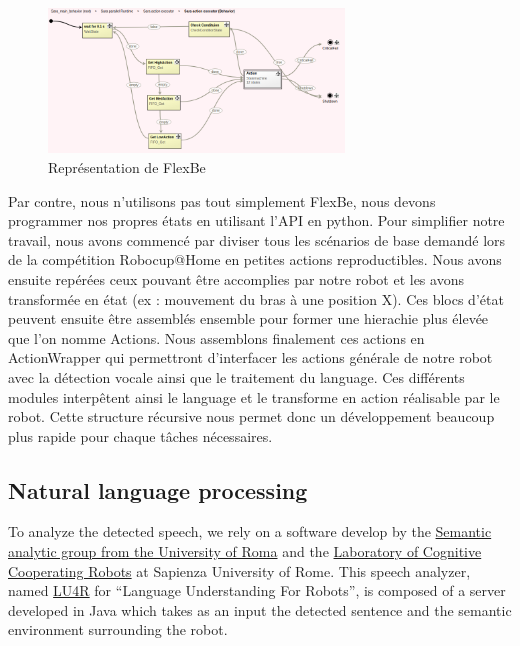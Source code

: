 \documentclass[runningheads,a4paper]{llncs}
\begin{document}
\begin{figure}[h!]
	\centering
	\includegraphics[width=0.70\textwidth]{images/flexbe.png}
	\caption{Représentation de FlexBe}
\end{figure}

Par contre, nous n'utilisons pas tout simplement FlexBe, nous devons programmer nos propres états en utilisant l'API en python. Pour simplifier notre travail, nous avons commencé par diviser tous les scénarios de base demandé lors de la compétition Robocup@Home en petites actions reproductibles. Nous avons ensuite repérées ceux pouvant être accomplies par notre robot et les avons transformée en état (ex : mouvement du bras à une position X). Ces blocs d'état peuvent ensuite être assemblés ensemble pour former une hierachie plus élevée que l'on nomme Actions. Nous assemblons finalement ces actions en ActionWrapper qui permettront d'interfacer les actions générale de notre robot avec la détection vocale ainsi que le traitement du language. Ces différents modules interpêtent ainsi le language et le transforme en action réalisable par le robot. Cette structure récursive nous permet donc un développement beaucoup plus rapide pour chaque tâches nécessaires. \\

\subsection{Natural language processing}
\tab To analyze the detected speech, we rely on a software develop by the  \href{http://sag.art.uniroma2.it/}{Semantic analytic group from the University of Roma} and the \href{http://labrococo.dis.uniroma1.it/}{Laboratory of Cognitive Cooperating Robots} at Sapienza University of Rome. This speech analyzer, named \href{http://sag.art.uniroma2.it/lu4r.html}{LU4R}\cite{lu4r} for “Language Understanding For Robots”, is composed of a server developed in Java which takes as an input the detected sentence and the semantic environment surrounding the robot.\\
\end{document}
